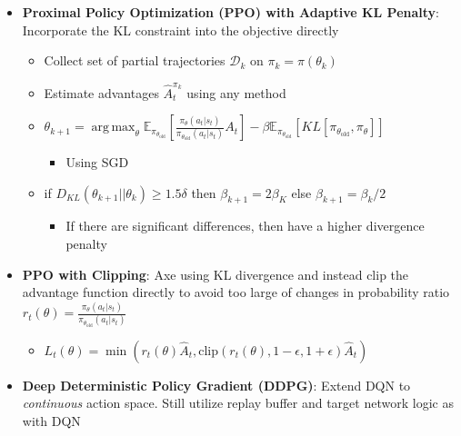 \documentclass[twocolumn]{article}
\providecommand{\tightlist}{%
  \setlength{\itemsep}{\GlobalItemSep}\setlength{\parskip}{\GlobalListParSkip}}
\newlength{\GlobalItemSep}
\newlength{\GlobalListParSkip}
\DeclareMathOperator*{\argmax}{arg\,max}
\begin{document}
\begin{itemize}
  \begin{itemize}
  \tightlist
  \item
    \textbf{Disadvantage}: Computing \(H\) is still expensive, and
    requires a large batch of rollouts to properly approximate \(H\)
  \end{itemize}
\item
  \textbf{Proximal Policy Optimization (PPO) with Adaptive KL Penalty}:
  Incorporate the KL constraint into the objective directly

  \begin{itemize}
  \tightlist
  \item
    Collect set of partial trajectories \(\mathcal{D}_k\) on
    \(\pi_k = \pi(\theta_k)\)
  \item
    Estimate advantages \(\hat{A}_t^{\pi_k}\) using any method
  \item
    \(\theta_{k+1} = \argmax_\theta \mathbb{E}_{\pi_{\theta_{\text{old}}}}[\frac{\pi_\theta (a_t | s_t)}{\pi_{\theta_{\text{old}}}(a_t | s_t)}A_t] - \beta \mathbb{E}_{\pi_{\theta_{\text{old}}}}[KL[\pi_{\theta_{\text{old}}}, \pi_\theta]]\)

    \begin{itemize}
    \tightlist
    \item
      Using SGD
    \end{itemize}
  \item
    if \(D_{KL}(\theta_{k+1}||\theta_k) \geq 1.5\delta\) then
    \(\beta_{k+1} = 2\beta_K\) else \(\beta_{k+1} = \beta_k / 2\)

    \begin{itemize}
    \tightlist
    \item
      If there are significant differences, then have a higher
      divergence penalty
    \end{itemize}
  \end{itemize}
\item
  \textbf{PPO with Clipping}: Axe using KL divergence and instead clip
  the advantage function directly to avoid too large of changes in
  probability ratio
  \(r_t(\theta) = \frac{\pi_\theta (a_t | s_t)}{\pi_{\theta_{\text{old}}}(a_t | s_t)}\)

  \begin{itemize}
  \tightlist
  \item
    \(L_t (\theta) = \min(r_t (\theta) \hat{A}_t, \text{clip}(r_t(\theta), 1 - \epsilon, 1 + \epsilon) \hat{A}_t)\)
  \end{itemize}
\item
  \textbf{Deep Deterministic Policy Gradient (DDPG)}: Extend DQN to
  \emph{continuous} action space. Still utilize replay buffer and target
  network logic as with DQN


\end{itemize}
\end{document}
